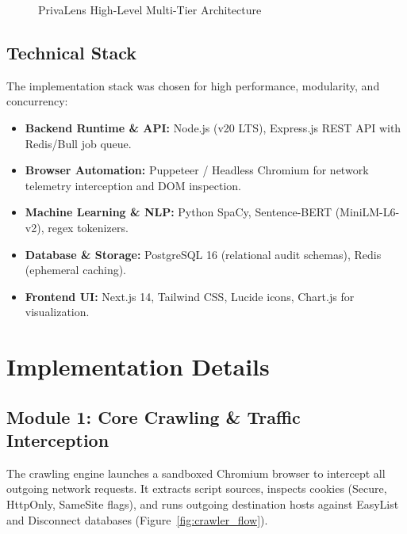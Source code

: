\documentclass[12pt, a4paper, oneside]{report}
\begin{document}
\begin{figure}[H]
{
}
\caption{PrivaLens High-Level Multi-Tier Architecture}
\label{fig:arch}
\end{figure}

\subsection{Technical Stack}
The implementation stack was chosen for high performance, modularity, and concurrency:
\begin{itemize}
    \item \textbf{Backend Runtime \& API:} Node.js (v20 LTS), Express.js REST API with Redis/Bull job queue.
    \item \textbf{Browser Automation:} Puppeteer / Headless Chromium for network telemetry interception and DOM inspection.
    \item \textbf{Machine Learning \& NLP:} Python SpaCy, Sentence-BERT (MiniLM-L6-v2), regex tokenizers.
    \item \textbf{Database \& Storage:} PostgreSQL 16 (relational audit schemas), Redis (ephemeral caching).
    \item \textbf{Frontend UI:} Next.js 14, Tailwind CSS, Lucide icons, Chart.js for visualization.
\end{itemize}

\section{Implementation Details}
\subsection{Module 1: Core Crawling \& Traffic Interception}
The crawling engine launches a sandboxed Chromium browser to intercept all outgoing network requests. It extracts script sources, inspects cookies (Secure, HttpOnly, SameSite flags), and runs outgoing destination hosts against EasyList and Disconnect databases (Figure~\ref{fig:crawler_flow}).
\end{document}
